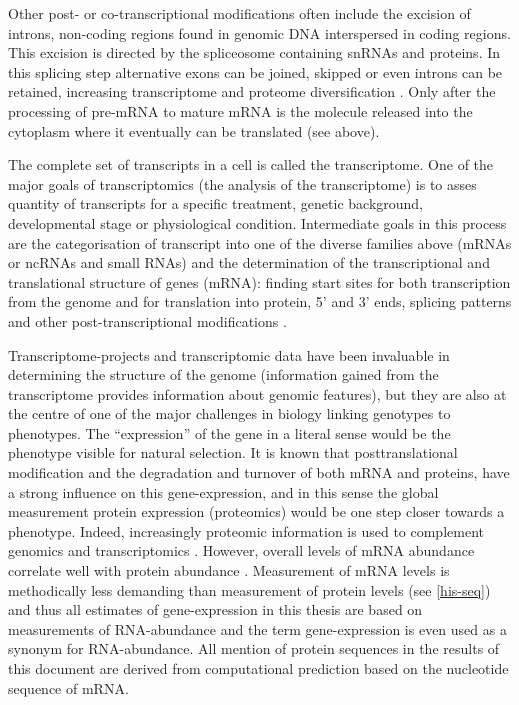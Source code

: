 Other post- or co-transcriptional modifications often include the
excision of introns, non-coding regions found in genomic DNA
interspersed in coding regions. This excision is directed by the
spliceosome containing snRNAs and proteins. In this splicing step
alternative exons can be joined, skipped or even introns can be
retained, increasing transcriptome and proteome diversification
\cite{pmid17158149}. Only after the processing of pre-mRNA to mature
mRNA is the molecule released into the cytoplasm where it eventually
can be translated (see above).

The complete set of transcripts in a cell is called the
transcriptome. One of the major goals of transcriptomics (the analysis
of the transcriptome) is to asses quantity of transcripts for a
specific treatment, genetic background, developmental stage or
physiological condition. Intermediate goals in this process are the
categorisation of transcript into one of the diverse families above
(mRNAs or ncRNAs and small RNAs) and the determination of the
transcriptional and translational structure of genes (mRNA): finding
start sites for both transcription from the genome and for translation
into protein, 5' and 3' ends, splicing patterns and other
post-transcriptional modifications \cite{pmid19015660}.

Transcriptome-projects and transcriptomic data have been invaluable in
determining the structure of the genome (information gained from the
transcriptome provides information about genomic features), but they
are also at the centre of one of the major challenges in biology
linking genotypes to phenotypes. The ``expression'' of the gene in a
literal sense would be the phenotype visible for natural selection. It
is known that posttranslational modification and the degradation and
turnover of both mRNA and proteins, have a strong influence on this
gene-expression, and in this sense the global measurement protein
expression (proteomics) would be one step closer towards a
phenotype. Indeed, increasingly proteomic information is used to
complement genomics and transcriptomics \cite{pmid20121477,
  pmid20237107}. However, overall levels of mRNA abundance correlate
well with protein abundance \cite{pmid21593866}. Measurement of mRNA
levels is methodically less demanding than measurement of protein
levels (see \ref{his-seq}) and thus all estimates of gene-expression
in this thesis are based on measurements of RNA-abundance and the term
gene-expression is even used as a synonym for RNA-abundance. All
mention of protein sequences in the results of this document are
derived from computational prediction based on the nucleotide sequence
of mRNA.

